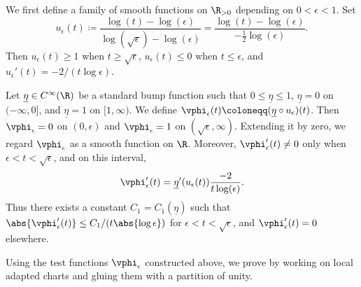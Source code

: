 \documentclass[12pt]{amsart}
\begin{document}
We first define a family of smooth functions on $\R_{>0}$ depending on
$0<\epsilon<1$. Set
\[
u_\epsilon(t)\coloneqq
\frac{\log(t)-\log(\epsilon)}{\log(\sqrt{\epsilon})-\log(\epsilon)}
=
\frac{\log(t)-\log(\epsilon)}{-\frac12\log(\epsilon)}.
\]
Then $u_\epsilon(t)\geq 1$ when $t\geq \sqrt{\epsilon}$,
$u_\epsilon(t)\leq 0$ when $t\leq \epsilon$, and
$u_\epsilon'(t)=-2/(t\log\epsilon)$.

Let $\underline{\eta}\in C^\infty(\R)$ be a standard bump function such that
$0\leq \underline{\eta}\leq 1$, $\underline{\eta}=0$ on $(-\infty,0]$, and
$\underline{\eta}=1$ on $[1,\infty)$. We define
$\vphi_\epsilon(t)\coloneqq(\underline{\eta}\circ u_\epsilon)(t)$. Then
$\vphi_\epsilon=0$ on $(0,\epsilon)$ and $\vphi_\epsilon=1$ on
$(\sqrt{\epsilon},\infty)$. Extending it by zero, we regard
$\vphi_\epsilon$ as a smooth function on $\R$. Moreover,
$\vphi_\epsilon'(t)\neq 0$ only when $\epsilon<t<\sqrt{\epsilon}$, and on
this interval,
\[
\vphi_\epsilon'(t)
=
\underline{\eta}'(u_\epsilon(t))\frac{-2}{t\log(\epsilon)}.
\]
Thus there exists a constant $C_1=C_1(\underline{\eta})$ such that
$\abs{\vphi_\epsilon'(t)}\leq C_1/(t\abs{\log\epsilon})$ for
$\epsilon<t<\sqrt{\epsilon}$, and $\vphi_\epsilon'(t)=0$ elsewhere.

Using the test functions $\vphi_\epsilon$ constructed above, we prove
 by working on local adapted charts and
gluing them with a partition of unity.
\end{document}
